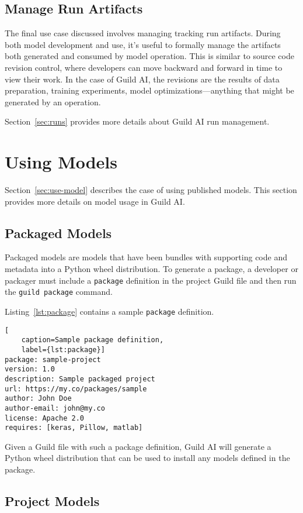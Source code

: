 \documentclass{article}
\begin{document}
\subsection{Manage Run Artifacts}

The final use case discussed involves managing tracking run artifacts.
During both model development and use, it's useful to formally manage
the artifacts both generated and consumed by model operation. This is
similar to source code revision control, where developers can move
backward and forward in time to view their work. In the case of Guild
AI, the revisions are the results of data preparation, training
experiments, model optimizations---anything that might be generated by
an operation.

Section~\ref{sec:runs} provides more details about Guild AI run
management.

\section{Using Models}

Section~\ref{sec:use-model} describes the case of using published
models. This section provides more details on model usage in Guild AI.

\subsection{Packaged Models}

Packaged models are models that have been bundles with supporting code
and metadata into a Python wheel distribution. To generate a package,
a developer or packager must include a \verb|package| definition in
the project Guild file and then run the \verb|guild package| command.

Listing~\ref{lst:package} contains a sample \verb|package| definition.

\begin{lstlisting}[
    caption=Sample package definition,
    label={lst:package}]
package: sample-project
version: 1.0
description: Sample packaged project
url: https://my.co/packages/sample
author: John Doe
author-email: john@my.co
license: Apache 2.0
requires: [keras, Pillow, matlab]
\end{lstlisting}

Given a Guild file with such a package definition, Guild AI will
generate a Python wheel distribution that can be used to install any
models defined in the package.

\subsection{Project Models}
\end{document}
